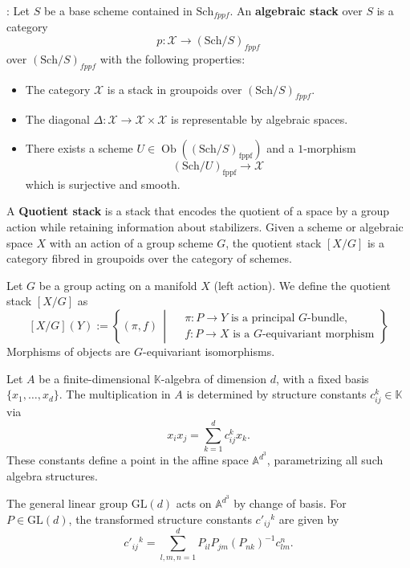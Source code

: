 \documentclass{amsart}
\begin{document}
\begin{definition}
\textnormal{\cite[Tag 026O]{stacks-project}:} Let $S$ be a base scheme contained in $\text{Sch}_{fppf}$. An \textbf{algebraic stack} over $S$ is a category 
\[
p: \mathcal{X} \to (\text{Sch}/S)_{fppf}
\]
over $(\text{Sch}/S)_{fppf}$ with the following properties:
\begin{itemize}
    \item The category $\mathcal{X}$ is a stack in groupoids over $(\text{Sch}/S)_{fppf}$.
    \item The diagonal $\Delta: \mathcal{X} \to \mathcal{X} \times \mathcal{X}$ is representable by algebraic spaces.
    \item There exists a scheme $U \in \operatorname{Ob}((\text{Sch}/S)_{\mathrm{fppf}})$ and a $1$-morphism 
    \[
    (\text{Sch}/U)_{\mathrm{fppf}} \to \mathcal{X}
    \]
    which is surjective and smooth.
\end{itemize}

\end{definition}

\begin{definition}
 A \textbf{Quotient stack} is a stack that encodes the quotient of a space by a group action while retaining information about stabilizers. Given a scheme or algebraic space \( X \) with an action of a group scheme \( G \), the quotient stack \( [X/G] \) is a category fibred in groupoids over the category of schemes.

Let $G$ be a group acting on a manifold $X$ (left action).
We define the quotient stack $[X/G]$ as
\[
[X/G](Y) := \left\{ (\pi, f) \,\middle|\,
\begin{aligned}
&\pi : P \to Y \text{ is a principal } G\text{-bundle,} \\
&f : P \to X \text{ is a } G\text{-equivariant morphism}
\end{aligned}
\right\}
\]
\textnormal{Morphisms of objects are $G$-equivariant isomorphisms.}
\end{definition}
Let \( A \) be a finite-dimensional \( \mathbb{K} \)-algebra of dimension \( d \), with a fixed basis \( \{x_1, \dots, x_d\} \). The multiplication in \( A \) is determined by structure constants \( c_{ij}^k \in \mathbb{K} \) via
\[
x_i x_j = \sum_{k=1}^d c_{ij}^k x_k.
\]
These constants define a point in the affine space \( \mathbb{A}^{d^3} \), parametrizing all such algebra structures.

The general linear group \( \mathrm{GL}(d) \) acts on \( \mathbb{A}^{d^3} \) by change of basis. For \( P \in \mathrm{GL}(d) \), the transformed structure constants \( c'_{ij}{}^k \) are given by
\[
c'_{ij}{}^k = \sum_{l,m,n=1}^d P_{il} P_{jm} (P_{nk})^{-1} c_{lm}^n.
\]
\end{document}
